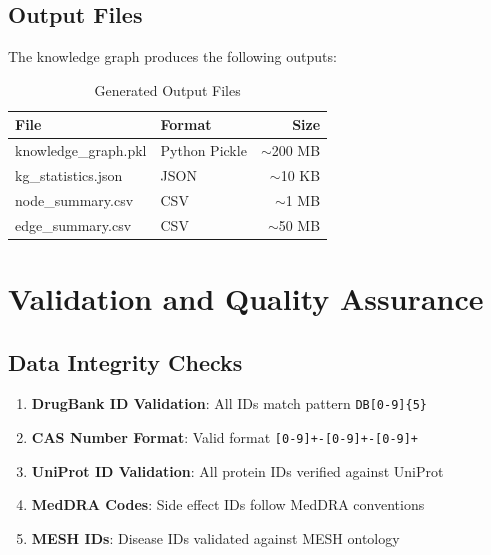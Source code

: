 \documentclass[11pt,a4paper]{article}
\begin{document}
\subsection{Output Files}

The knowledge graph produces the following outputs:

\begin{table}[h]
\centering
\caption{Generated Output Files}
\begin{tabular}{@{}llr@{}}
\toprule
\textbf{File} & \textbf{Format} & \textbf{Size} \\
\midrule
knowledge\_graph.pkl & Python Pickle & $\sim$200 MB \\
kg\_statistics.json & JSON & $\sim$10 KB \\
node\_summary.csv & CSV & $\sim$1 MB \\
edge\_summary.csv & CSV & $\sim$50 MB \\
\bottomrule
\end{tabular}
\end{table}

\newpage
\section{Validation and Quality Assurance}

\subsection{Data Integrity Checks}

\begin{enumerate}
    \item \textbf{DrugBank ID Validation}: All IDs match pattern \texttt{DB[0-9]\{5\}}
    \item \textbf{CAS Number Format}: Valid format \texttt{[0-9]+-[0-9]+-[0-9]+}
    \item \textbf{UniProt ID Validation}: All protein IDs verified against UniProt
    \item \textbf{MedDRA Codes}: Side effect IDs follow MedDRA conventions
    \item \textbf{MESH IDs}: Disease IDs validated against MESH ontology
\end{enumerate}

\end{document}
